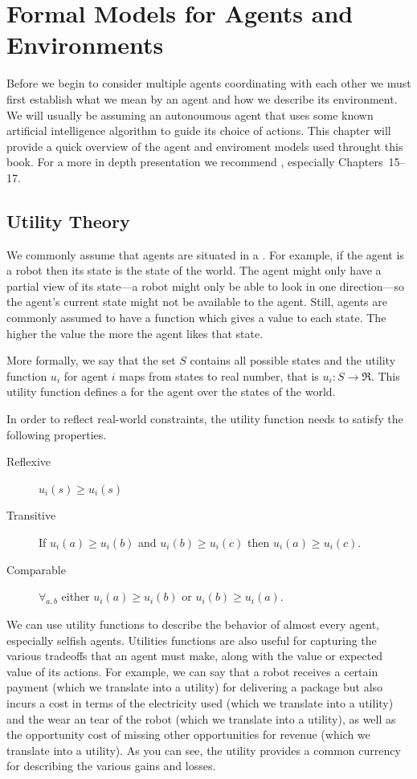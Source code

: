 \chapter[Formal Models]{Formal Models for Agents and Environments}
\label{cha:formal-models}

Before we begin to consider multiple agents coordinating with each
other we must first establish what we mean by an agent and how we
describe its environment. We will usually be assuming an autonoumous
agent that uses some known artificial intelligence algorithm to guide
its choice of actions. This chapter will provide a quick overview of
the agent and enviroment models used throught this book. For a more in
depth presentation we recommend \cite{russell03a}, especially
Chapters~15--17.

\section{Utility Theory}
\label{sec:utility-theory}

We commonly assume that agents are situated in a . For
example, if the agent is a robot then its state is the state of the
world. The agent might only have a partial view of its state---a robot
might only be able to look in one direction---so the agent's current
state might not be available to the agent. Still, agents are commonly
assumed to have a  function which gives a value to each
state. The higher the value the more the agent likes that state.

More formally, we say that the set $S$ contains all possible states
and the utility function $u_i$ for agent $i$ maps from states to real
number, that is $u_i : S \rightarrow \Re$. This utility function
defines a  for the agent over the states of
the world. 

In order to reflect real-world constraints, the utility function needs
to satisfy the following properties.

\begin{description}
\item[Reflexive] $u_i(s) \geq u_i(s)$
\item[Transitive] If $u_i(a) \geq u_i(b)$ and $u_i(b) \geq u_i(c)$ then $u_i(a) \geq u_i(c)$.
\item[Comparable] $\forall_{a,b}$ either $u_i(a) \geq u_i(b)$ or
  $u_i(b) \geq u_i(a)$.
\end{description}

We can use utility functions to describe the behavior of almost every
agent, especially selfish agents. Utilities functions are also useful
for capturing the various tradeoffs that an agent must make, along
with the value or expected value of its actions. For example, we can
say that a robot receives a certain payment (which we translate into a
utility) for delivering a package but also incurs a cost in terms of
the electricity used (which we translate into a utility) and the wear
an tear of the robot (which we translate into a utility), as well as
the opportunity cost of missing other opportunities for revenue (which
we translate into a utility). As you can see, the utility provides a
common currency for describing the various gains and losses.

